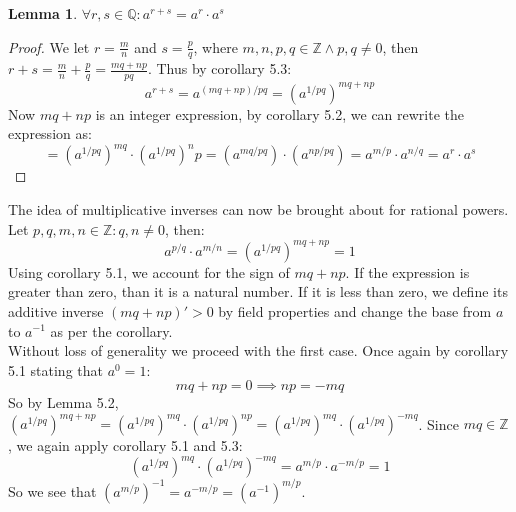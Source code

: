 \documentclass{article}
\newtheorem{lem}{Lemma}[section]
\begin{document}
\medskip
\begin{lem}
$\forall r, s \in \mathbb{Q}: a^{r+s} = a^r \cdot a^s$
\end{lem}
\begin{proof}
We let $r = \frac{m}{n}$ and $s = \frac{p}{q}$, where $m, n, p, q \in \mathbb{Z} \land p, q \neq 0$, then $r + s = \frac{m}{n} + \frac{p}{q} = \frac{mq + np}{pq}$. Thus by corollary 5.3:
\begin{equation*}
    a^{r+s} = a^{(mq + np)/pq} = (a^{1/pq})^{mq + np}
\end{equation*}
Now $mq + np$ is an integer expression, by corollary 5.2, we can rewrite the expression as:
\begin{equation*}
    = (a^{1/pq})^{mq} \cdot (a^{1/pq})^np = (a^{mq/pq}) \cdot (a^{np/pq}) = a^{m/p} \cdot a^{n/q} = a^r \cdot a^s
\end{equation*}
\end{proof}
The idea of multiplicative inverses can now be brought about for rational powers. Let $p, q, m, n \in \mathbb{Z}: q, n \neq 0$, then:
\begin{equation*}
    a^{p/q} \cdot a^{m/n} = (a^{1/pq})^{mq + np} = 1
\end{equation*}
Using corollary 5.1, we account for the sign of $mq + np$. If the expression is greater than zero, than it is a natural number. If it is less than zero, we define its additive inverse $(mq + np)' > 0$ by field properties and change the base from $a$ to $a^{-1}$ as per the corollary.\\

Without loss of generality we proceed with the first case. Once again by corollary 5.1 stating that $a^0 = 1$:
\begin{equation*}
    mq + np = 0 \implies np = -mq
\end{equation*}
So by Lemma 5.2, $(a^{1/pq})^{mq + np} = (a^{1/pq})^{mq} \cdot (a^{1/pq})^{np} = (a^{1/pq})^{mq} \cdot (a^{1/pq})^{-mq}$. Since $mq \in \mathbb{Z}$, we again apply corollary 5.1 and 5.3:
\begin{equation*}
    (a^{1/pq})^{mq} \cdot (a^{1/pq})^{-mq} = a^{m/p} \cdot a^{-m/p} = 1
\end{equation*}
So we see that $(a^{m/p})^{-1} = a^{-m/p} = (a^{-1})^{m/p}$.
\end{document}
